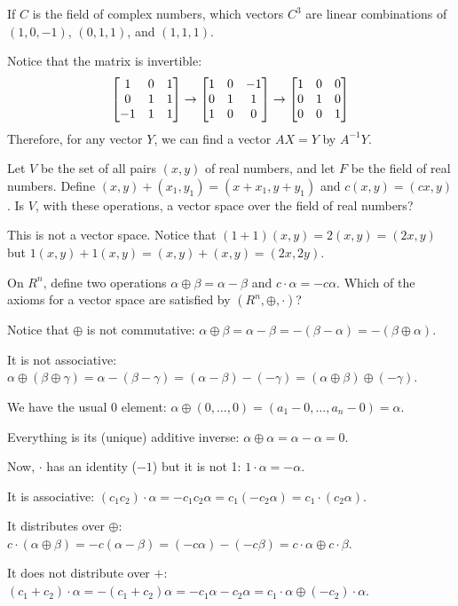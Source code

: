 \documentclass[notes]{agony}
\begin{document}
\begin{xca}
  If $C$ is the field of complex numbers, which vectors $C^3$ are linear combinations
  of $(1,0,-1)$, $(0,1,1)$, and $(1,1,1)$.
\end{xca}
\begin{sol}
  Notice that the matrix is invertible:
  \[ \mqty[1&0&1\\0&1&1\\-1&1&1] \to \mqty[1&0&-1\\0&1&1\\1&0&0] \to \mqty[1&0&0\\0&1&0\\0&0&1] \]
  Therefore, for any vector $Y$, we can find a vector $AX = Y$ by $A^{-1}Y$.
\end{sol}

\begin{xca}
  Let $V$ be the set of all pairs $(x,y)$ of real numbers,
  and let $F$ be the field of real numbers.
  Define $(x,y) + (x_1,y_1) = (x+x_1,y+y_1)$ and $c(x,y) = (cx,y)$.
  Is $V$, with these operations, a vector space over the field of real numbers?
\end{xca}
\begin{sol}
  This is not a vector space.
  Notice that $(1+1)(x,y) = 2(x,y) = (2x,y)$
  but $1(x,y) + 1(x,y) = (x,y) + (x,y) = (2x,2y)$.
\end{sol}

\begin{xca}
  On $R^n$, define two operations $\alpha \oplus \beta = \alpha - \beta$
  and $c\cdot\alpha = -c\alpha$.
  Which of the axioms for a vector space are satisfied by $(R^n,\oplus,\cdot)$?
\end{xca}
\begin{sol}
  Notice that $\oplus$ is not commutative:
  $\alpha \oplus \beta = \alpha - \beta = -(\beta - \alpha) = -(\beta \oplus \alpha)$.

  It is not associative:
  $\alpha \oplus (\beta \oplus \gamma) = \alpha - (\beta - \gamma)
    = (\alpha - \beta) - (-\gamma) = (\alpha \oplus \beta) \oplus (-\gamma)$.

  We have the usual 0 element: $\alpha \oplus (0,\dotsc,0) = (a_1-0,\dotsc,a_n-0) = \alpha$.

  Everything is its (unique) additive inverse: $\alpha \oplus \alpha = \alpha - \alpha = 0$.

  Now, $\cdot$ has an identity ($-1$) but it is not 1: $1\cdot\alpha = -\alpha$.

  It is associative: $(c_1c_2)\cdot\alpha = -c_1c_2\alpha = c_1(-c_2\alpha) = c_1\cdot(c_2\alpha)$.

  It distributes over $\oplus$:
  $c\cdot(\alpha \oplus \beta) = -c(\alpha - \beta) = (-c\alpha) - (-c\beta) = c\cdot\alpha \oplus c\cdot\beta$.

  It does not distribute over $+$:
  $(c_1+c_2)\cdot\alpha = -(c_1+c_2)\alpha = -c_1\alpha - c_2\alpha = c_1\cdot\alpha \oplus (-c_2)\cdot\alpha$.
\end{sol}
\end{document}
